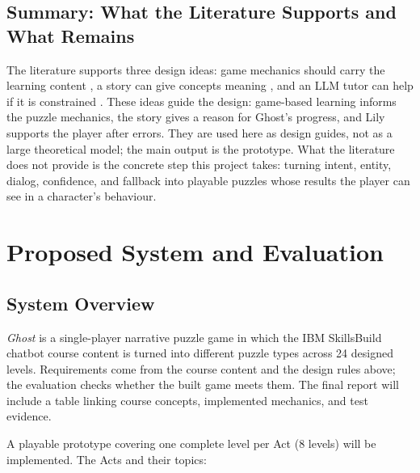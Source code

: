 \documentclass[11pt,a4paper]{article}
\begin{document}
\subsection{Summary: What the Literature Supports and What Remains}

The literature supports three design ideas: game mechanics should carry the learning content \cite{mayer2019,plass2015}, a story can give concepts meaning \cite{lester2014,rowe2011}, and an LLM tutor can help if it is constrained \cite{huber2024,nye2023,yusuf2025}. These ideas guide the design: game-based learning informs the puzzle mechanics, the story gives a reason for Ghost's progress, and Lily supports the player after errors. They are used here as design guides, not as a large theoretical model; the main output is the prototype. What the literature does not provide is the concrete step this project takes: turning intent, entity, dialog, confidence, and fallback into playable puzzles whose results the player can see in a character's behaviour.

\section{Proposed System and Evaluation}

\subsection{System Overview}

\textit{Ghost} is a single-player narrative puzzle game in which the IBM SkillsBuild chatbot course content is turned into different puzzle types across 24 designed levels. Requirements come from the course content and the design rules above; the evaluation checks whether the built game meets them. The final report will include a table linking course concepts, implemented mechanics, and test evidence.

A playable prototype covering one complete level per Act (8 levels) will be implemented. The Acts and their topics:
\end{document}
